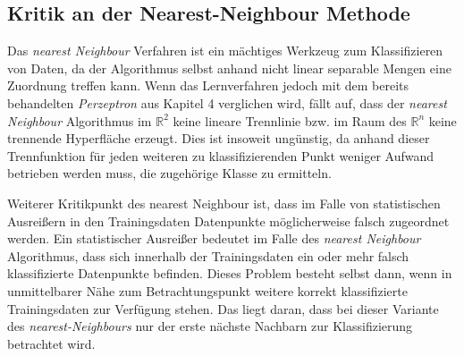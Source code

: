 \documentclass[fontsize=11pt]{scrartcl}
\begin{document}
            \subsection{Kritik an der Nearest-Neighbour Methode}
                Das \emph{nearest Neighbour} Verfahren ist ein mächtiges Werkzeug zum Klassifizieren von Daten, da der Algorithmus selbst anhand nicht linear separable Mengen eine Zuordnung treffen kann.\cite{ertel2016} Wenn das Lernverfahren jedoch mit dem bereits behandelten \emph{Perzeptron} aus Kapitel 4 verglichen wird, fällt auf, dass der \emph{nearest Neighbour} Algorithmus im $\mathbb{R}^2$ keine lineare Trennlinie bzw. im Raum des $\mathbb{R}^n$ keine trennende Hyperfläche erzeugt. Dies ist insoweit ungünstig, da anhand dieser Trennfunktion für jeden weiteren zu klassifizierenden Punkt weniger Aufwand betrieben werden muss, die zugehörige Klasse zu ermitteln.\cite{ertel2016}\par
                Weiterer Kritikpunkt des nearest Neighbour ist, dass im Falle von statistischen Ausreißern in den Trainingsdaten Datenpunkte möglicherweise falsch zugeordnet werden. Ein statistischer Ausreißer bedeutet im Falle des \emph{nearest Neighbour} Algorithmus, dass sich innerhalb der Trainingsdaten ein oder mehr falsch klassifizierte Datenpunkte befinden. Dieses Problem besteht selbst dann, wenn in unmittelbarer Nähe zum Betrachtungspunkt weitere korrekt klassifizierte Trainingsdaten zur Verfügung stehen. Das liegt daran, dass bei dieser Variante des \emph{nearest-Neighbours} nur der erste nächste Nachbarn zur Klassifizierung betrachtet wird.\cite{ertel2016}\par
                         
\end{document}
